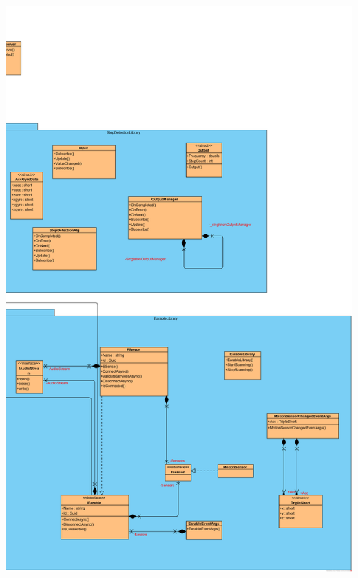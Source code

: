 \documentclass[../entwurf.tex]{subfiles}
\begin{document}
\includegraphics[scale=0.12]{../graphics/uml_diagramme/Gesamt/7.png}
\end{document}
